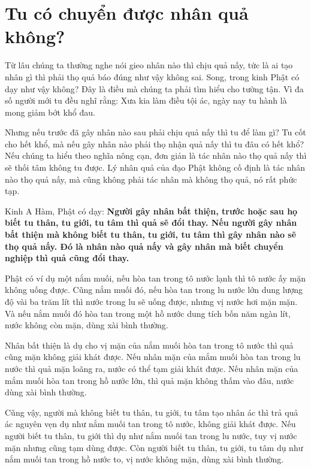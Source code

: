 \documentclass[
  12pt,
  oneside]{book}
\begin{document}
\hypertarget{tu-co-chuyen-duoc-nhan-qua-khong}{%
\chapter*{Tu có chuyển được nhân quả không?}\label{tu-co-chuyen-duoc-nhan-qua-khong}}

Từ lâu chúng ta thường nghe nói gieo nhân nào thì chịu quả nấy, tức là ai tạo nhân gì thì phải thọ quả báo đúng như vậy không sai. Song, trong kinh Phật có dạy như vậy không? Đây là điều mà chúng ta phải tìm hiểu cho tường tận. Vì đa số người mới tu đều nghĩ rằng: Xưa kia làm điều tội ác, ngày nay tu hành là mong giảm bớt khổ đau.

Nhưng nếu trước đã gây nhân nào sau phải chịu quả nấy thì tu để làm gì? Tu cốt cho hết khổ, mà nếu gây nhân nào phải thọ nhận quả nấy thì tu đâu có hết khổ? Nếu chúng ta hiểu theo nghĩa nông cạn, đơn giản là tác nhân nào thọ quả nấy thì sẽ thối tâm không tu được. Lý nhân quả của đạo Phật không cố định là tác nhân nào thọ quả nấy, mà cũng không phải tác nhân mà không thọ quả, nó rất phức tạp.

Kinh A Hàm, Phật có dạy: \textbf{Người gây nhân bất thiện, trước hoặc sau họ biết tu thân, tu giới, tu tâm thì quả sẽ đổi thay. Nếu người gây nhân bất thiện mà không biết tu thân, tu giới, tu tâm thì gây nhân nào sẽ thọ quả nấy. Đó là nhân nào quả nấy và gây nhân mà biết chuyển nghiệp thì quả cũng đổi thay.}

Phật có ví dụ một nắm muối, nếu hòa tan trong tô nước lạnh thì tô nước ấy mặn không uống được. Cũng nắm muối đó, nếu hòa tan trong lu nước lớn dung lượng độ vài ba trăm lít thì nước trong lu sẽ uống được, nhưng vị nước hơi mặn mặn. Và nếu nắm muối đó hòa tan trong một hồ nước dung tích bốn năm ngàn lít, nước không còn mặn, dùng xài bình thường.

Nhân bất thiện là dụ cho vị mặn của nắm muối hòa tan trong tô nước thì quả cũng mặn không giải khát được. Nếu nhân mặn của mắm muối hòa tan trong lu nước thì quả mặn loãng ra, nước có thể tạm giải khát được. Nếu nhân mặn của mắm muối hòa tan trong hồ nước lớn, thì quả mặn không thấm vào đâu, nước dùng xài bình thường.

Cũng vậy, người mà không biết tu thân, tu giới, tu tâm tạo nhân ác thì trả quả ác nguyên vẹn dụ như nắm muối tan trong tô nước, không giải khát được. Nếu người biết tu thân, tu giới thì dụ như nắm muối tan trong lu nước, tuy vị nước mặn nhưng cũng tạm dùng được. Còn người biết tu thân, tu giới, tu tâm dụ như nắm muối tan trong hồ nước to, vị nước không mặn, dùng xài bình thường.
\end{document}
